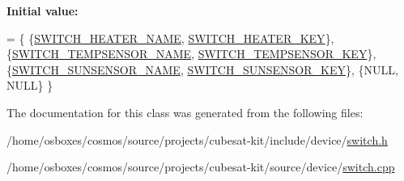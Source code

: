 {\bfseries Initial value\+:}
\begin{DoxyCode}
= \{
    \{\hyperlink{switch_8h_a128560820edeca7416767b0278974f97}{SWITCH\_HEATER\_NAME}, \hyperlink{switch_8h_ac4a41c3b8145477d4d658f975adfc5de}{SWITCH\_HEATER\_KEY}\},
    \{\hyperlink{switch_8h_ab87f0daf3c993cbb43485e40fd11a584}{SWITCH\_TEMPSENSOR\_NAME}, \hyperlink{switch_8h_a34ce8812e308ab41e84a54561ab5e29d}{SWITCH\_TEMPSENSOR\_KEY}\},
    \{\hyperlink{switch_8h_a079b325f48bc449963b8f5c0b84c1455}{SWITCH\_SUNSENSOR\_NAME}, \hyperlink{switch_8h_a0e876cac82ae0ac174eb90ee8f919288}{SWITCH\_SUNSENSOR\_KEY}\},
    \{NULL, NULL\}
\}
\end{DoxyCode}


The documentation for this class was generated from the following files\+:\begin{DoxyCompactItemize}
\item 
/home/osboxes/cosmos/source/projects/cubesat-\/kit/include/device/\hyperlink{switch_8h}{switch.\+h}\item 
/home/osboxes/cosmos/source/projects/cubesat-\/kit/source/device/\hyperlink{switch_8cpp}{switch.\+cpp}\end{DoxyCompactItemize}
